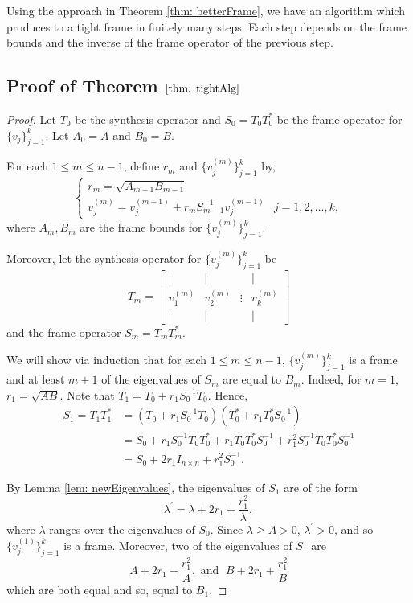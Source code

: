 \documentclass[11pt, reqno]{amsart}
\numberwithin{equation}{section}
\begin{document}
Using the approach in Theorem \ref{thm: betterFrame}, we have an algorithm which produces to a tight frame in finitely many steps. Each step depends on the frame bounds and the inverse of the frame operator of the previous step. 

\subsection{Proof of Theorem $\ref{thm: tightAlg}$}
\begin{proof}
    Let $T_0$ be the synthesis operator and $S_0=T_0T_0^*$ be the frame operator for $\{v_j\}_{j=1}^k$. Let $A_0=A$ and $B_0=B$.


    \noindent For each $1\le m\le n-1$, define $r_m$ and $\{v_j^{(m)}\}_{j=1}^k$ by, $$\begin{cases}
        r_m=\sqrt{A_{m-1}B_{m-1}}\\
        v_j^{(m)}= v_j^{(m-1)}+r_mS_{m-1}^{-1}v_j^{(m-1)} & j=1,2,\dots, k,
    \end{cases}$$ where $A_m, B_m$ are the frame bounds for $\{v_j^{(m)}\}_{j=1}^k$.

    Moreover, let the synthesis operator for $\{v_j^{(m)}\}_{j=1}^k$ be $$T_m = \begin{bmatrix}
            \vert & \vert & & \vert\\
            v_1^{(m)} & v_2^{(m)} & \vdots & v_k^{(m)}\\
            \vert & \vert & & \vert
    \end{bmatrix}$$ and the frame operator 
        $S_m = T_mT_m^*$.

    

    We will show via induction that for each $1\le m\le n-1$, $\{v_{j}^{(m)}\}_{j=1}^k$ is a frame and at least $m+1$ of the eigenvalues of $S_m$ are equal to $B_m$.  Indeed, for $m=1$, $r_1=\sqrt{AB}.$  Note that $T_1 = T_{0}+r_1S_{0}^{-1}T_{0}.$ Hence, \begin{align*}
        S_1 = T_1T_1^* &= (T_{0}+r_1S_{0}^{-1}T_{0})(T_{0}^*+r_1T_0^*S_{0}^{-1})\\
        &= S_0+r_1S_0^{-1}T_0T_0^*+ r_1T_0T_0^*S_0^{-1}+r_1^2S_0^{-1}T_0T_0^*S_0^{-1}\\
        &=S_0+2r_1I_{n\times n}+r_1^2S_0^{-1}.
    \end{align*}
    
     \noindent By Lemma \ref{lem: newEigenvalues}, the eigenvalues of $S_1$ are of the form $$\lambda^\prime =\lambda+2r_1+\frac{r_1^2}{\lambda},$$ where $\lambda$ ranges over the eigenvalues of $S_0$. Since $\lambda\ge A>0$, $\lambda^\prime >0$, and so $\{v_j^{(1)}\}_{j=1}^k$ is a frame. Moreover, two of the eigenvalues of $S_1$ are $$A+2r_1+\frac{r_1^2}{A}, \text{ and } \; B+2r_1+\frac{r_1^2}{B}$$ which are both equal and so, equal to $B_1$.


\end{proof}
\end{document}
